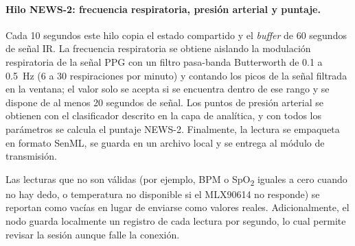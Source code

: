 \documentclass[11pt,a4paper]{article}
\begin{document}
\paragraph{Hilo NEWS-2: frecuencia respiratoria, presión arterial y puntaje.} Cada 10 segundos este hilo copia el estado compartido y el \textit{buffer} de 60 segundos de señal IR. La frecuencia respiratoria se obtiene aislando la modulación respiratoria de la señal PPG con un filtro pasa-banda Butterworth de 0.1 a 0.5~Hz (6 a 30 respiraciones por minuto) y contando los picos de la señal filtrada en la ventana; el valor solo se acepta si se encuentra dentro de ese rango y se dispone de al menos 20 segundos de señal. Los puntos de presión arterial se obtienen con el clasificador descrito en la capa de analítica, y con todos los parámetros se calcula el puntaje NEWS-2. Finalmente, la lectura se empaqueta en formato SenML, se guarda en un archivo local y se entrega al módulo de transmisión.

Las lecturas que no son válidas (por ejemplo, BPM o SpO\textsubscript{2} iguales a cero cuando no hay dedo, o temperatura no disponible si el MLX90614 no responde) se reportan como vacías en lugar de enviarse como valores reales. Adicionalmente, el nodo guarda localmente un registro de cada lectura por segundo, lo cual permite revisar la sesión aunque falle la conexión.
\end{document}
